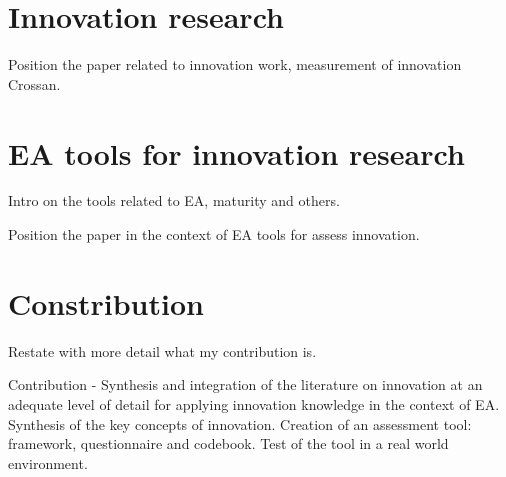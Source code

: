 
\section{Innovation research}
Position the paper related to innovation work, measurement of innovation Crossan.





\section{EA tools for innovation research}
Intro on the tools related to EA, maturity and others.

Position the paper in the context of EA tools for assess innovation.


\section{Constribution}
Restate with more detail what my contribution is.

Contribution - Synthesis and integration of the literature on innovation at an adequate level of detail for applying innovation knowledge in the context of EA. 
Synthesis of the key concepts of innovation. 
Creation of an assessment tool: framework, questionnaire and codebook. 
Test of the tool in a real world environment.


